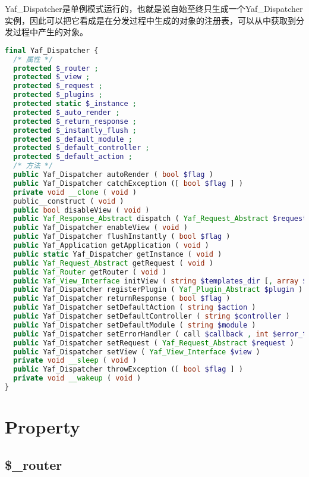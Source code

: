 Yaf\_Dispatcher是单例模式运行的，也就是说自始至终只生成一个Yaf\_Dispatcher实例，因此可以把它看成是在分发过程中生成的对象的注册表，可以从中获取到分发过程中产生的对象。



\begin{lstlisting}[language=PHP]
final Yaf_Dispatcher {
  /* 属性 */
  protected $_router ;
  protected $_view ;
  protected $_request ;
  protected $_plugins ;
  protected static $_instance ;
  protected $_auto_render ;
  protected $_return_response ;
  protected $_instantly_flush ;
  protected $_default_module ;
  protected $_default_controller ;
  protected $_default_action ;
  /* 方法 */
  public Yaf_Dispatcher autoRender ( bool $flag )
  public Yaf_Dispatcher catchException ([ bool $flag ] )
  private void __clone ( void )
  public__construct ( void )
  public bool disableView ( void )
  public Yaf_Response_Abstract dispatch ( Yaf_Request_Abstract $request )
  public Yaf_Dispatcher enableView ( void )
  public Yaf_Dispatcher flushInstantly ( bool $flag )
  public Yaf_Application getApplication ( void )
  public static Yaf_Dispatcher getInstance ( void )
  public Yaf_Request_Abstract getRequest ( void )
  public Yaf_Router getRouter ( void )
  public Yaf_View_Interface initView ( string $templates_dir [, array $options ] )
  public Yaf_Dispatcher registerPlugin ( Yaf_Plugin_Abstract $plugin )
  public Yaf_Dispatcher returnResponse ( bool $flag )
  public Yaf_Dispatcher setDefaultAction ( string $action )
  public Yaf_Dispatcher setDefaultController ( string $controller )
  public Yaf_Dispatcher setDefaultModule ( string $module )
  public Yaf_Dispatcher setErrorHandler ( call $callback , int $error_types )
  public Yaf_Dispatcher setRequest ( Yaf_Request_Abstract $request )
  public Yaf_Dispatcher setView ( Yaf_View_Interface $view )
  private void __sleep ( void )
  public Yaf_Dispatcher throwException ([ bool $flag ] )
  private void __wakeup ( void )
}
\end{lstlisting}



\section{Property}





\subsection{\$\_router}

